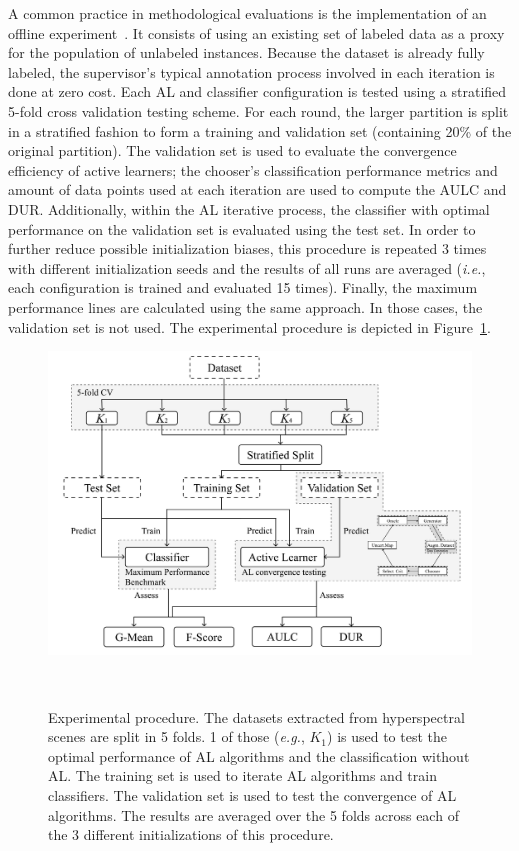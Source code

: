 A common practice in methodological evaluations is the implementation of an
offline experiment~\cite{Kagy2019}. It consists of using an existing set of
labeled data as a proxy for the population of unlabeled instances. Because the
dataset is already fully labeled, the supervisor's typical annotation process
involved in each iteration is done at zero cost. Each AL and classifier
configuration is tested using a stratified 5-fold cross validation testing
scheme. For each round, the larger partition is split in a stratified fashion
to form a training and validation set (containing 20\% of the original
partition). The validation set is used to evaluate the convergence efficiency
of active learners; the chooser's classification performance metrics and
amount of data points used at each iteration are used to compute the AULC and
DUR\@. Additionally, within the AL iterative process, the classifier with
optimal performance on the validation set is evaluated using the test set. In
order to further reduce possible initialization biases, this procedure is
repeated 3 times with different initialization seeds and the results of all
runs are averaged (\textit{i.e.}, each configuration is trained and evaluated
15 times). Finally, the maximum performance lines are calculated using the
same approach. In those cases, the validation set is not used. The
experimental procedure is depicted in
Figure~\ref{fig:experiment_pipeline_al_generator}.

\begin{figure}
	\centering
	\includegraphics[width=.65\linewidth]{experiment_pipeline}
    \caption[Experimental procedure.]{%
        Experimental procedure. The datasets extracted from hyperspectral
        scenes are split in 5 folds. 1 of those (\textit{e.g.}, $K_1$) is used
        to test the optimal performance of AL algorithms and the
        classification without AL. The training set is used to iterate AL
        algorithms and train classifiers. The validation set is used to test
        the convergence of AL algorithms. The results are averaged over the 5
        folds across each of the 3 different initializations of this
        procedure.
    }~\label{fig:experiment_pipeline_al_generator}
\end{figure}

